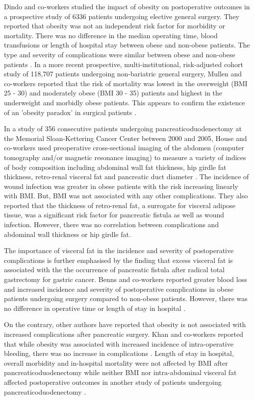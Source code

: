 Dindo and co-workers studied the impact of obesity on postoperative outcomes in a prospective study of 6336 patients undergoing elective general surgery. 
They reported that obesity was not an independent risk factor for morbidity or mortality. 
There was no difference in the median operating time, blood transfusions or length of hospital stay between obese and non-obese patients. 
The type and severity of complications were similar between obese and non-obese patients \parencite{dindo_obesity_2003}. 
In a more recent prospective, multi-institutional, risk-adjusted cohort study of 118,707 patients undergoing non-bariatric general surgery, Mullen and co-workers reported that the risk of mortality was lowest in the overweight (BMI 25 - 30) and moderately obese (BMI 30 - 35) patients and highest in the underweight and morbidly obese patients. 
This appears to confirm the existence of an 'obesity paradox' in surgical patients \parencite{mullen_obesity_2009}.

In a study of 356 consecutive patients undergoing pancreaticoduodenectomy at the Memorial Sloan-Kettering Cancer Center between 2000 and 2005, House and co-workers used preoperative cross-sectional imaging of the abdomen (computer tomography and/or magnetic resonance imaging) to measure a variety of indices of body composition including abdominal wall fat thickness, hip girdle fat thickness, retro-renal visceral fat and pancreatic duct diameter \parencite{house_preoperative_2008}. 
The incidence of wound infection was greater in obese patients with the risk increasing linearly with BMI. 
But, BMI was not associated with any other complications. 
They also reported that the thickness of retro-renal fat, a surrogate for visceral adipose tissue, was a significant risk factor for pancreatic fistula as well as wound infection. 
However, there was no correlation between complications and abdominal wall thickness or hip girdle fat. 

The importance of visceral fat in the incidence and severity of postoperative complications is further emphasised by the finding that excess visceral fat is associated with the the occurrence of pancreatic fistula after radical total gastrectomy for gastric cancer. 
Benns and co-workers reported greater blood loss and increased incidence and severity of postoperative complications in obese patients undergoing surgery compared to non-obese patients. 
However, there was no difference in operative time or length of stay in hospital \parencite{benns_impact_2009}.

On the contrary, other authors have reported that obesity is not associated with increased complications after pancreatic surgery. 
Khan and co-workers reported that while obesity was associated with increased incidence of intra-operative bleeding, there was no increase in complications \parencite{khan_does_2010}. 
Length of stay in hospital, overall morbidity and in-hospital mortality were not affected by BMI after pancreaticoduodenectomy \parencite{tsai_impact_2010} while neither BMI nor intra-abdominal visceral fat affected postoperative outcomes in another study of patients undergoing pancreaticoduodenectomy \parencite{balentine_obesity_2011}.

